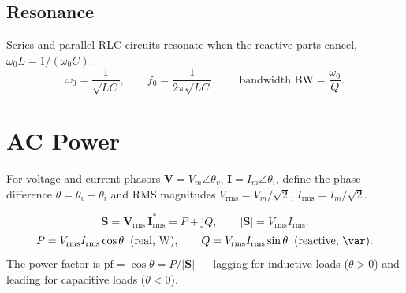 \documentclass{essay}
\newcommand{\jj}{\mathrm{j}}
\begin{document}
\subsection{Resonance}
Series and parallel RLC circuits resonate when the reactive parts cancel,
$\omega_0 L = 1/(\omega_0 C)$:
\[
  \omega_0 = \frac{1}{\sqrt{LC}}, \qquad
  f_0 = \frac{1}{2\pi\sqrt{LC}}, \qquad
  \text{bandwidth } \mathrm{BW} = \frac{\omega_0}{Q}.
\]

\section{AC Power}

For voltage and current phasors $\mathbf{V}=V_m\angle\theta_v$,
$\mathbf{I}=I_m\angle\theta_i$, define the phase difference
$\theta = \theta_v - \theta_i$ and RMS magnitudes
$V_{\mathrm{rms}}=V_m/\sqrt2$, $I_{\mathrm{rms}}=I_m/\sqrt2$.

\[
  \mathbf{S} = \mathbf{V}_{\mathrm{rms}}\,\mathbf{I}_{\mathrm{rms}}^{*}
  = P + \jj Q,
  \qquad
  |\mathbf{S}| = V_{\mathrm{rms}} I_{\mathrm{rms}}.
\]
\[
  P = V_{\mathrm{rms}} I_{\mathrm{rms}}\cos\theta \;\;(\text{real, \si{\watt}}),
  \qquad
  Q = V_{\mathrm{rms}} I_{\mathrm{rms}}\sin\theta
  \;\;(\text{reactive, \si{\var}}).
\]
The power factor is $\mathrm{pf} = \cos\theta = P/|\mathbf{S}|$ --- lagging for
inductive loads ($\theta>0$) and leading for capacitive loads ($\theta<0$).
\end{document}
